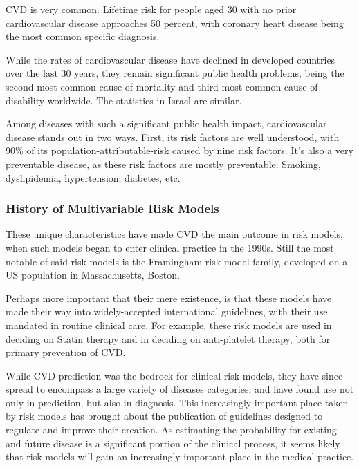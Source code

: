 \documentclass[a4paper,12pt]{article}
\begin{document}
			CVD is very common. Lifetime risk for people aged 30 with no prior cardiovascular disease approaches 50 percent\cite{Rapsomaniki2014}, with coronary heart disease being the most common specific diagnosis\cite{Benjamin2017}.
			
			While the rates of cardiovascular disease have declined in developed countries over the last 30 years\cite{Koton2014,Vangen-Loenne2017}, they remain significant public health problems, being the second most common cause of mortality and third most common cause of disability worldwide\cite{Lozano2012}. The statistics in Israel are similar\cite{ICDC2017}.
			
			Among diseases with such a significant public health impact, cardiovascular disease stands out in two ways. First, its risk factors are well understood, with 90\% of its population-attributable-risk caused by nine risk factors. It's also a very preventable disease, as these risk factors are mostly preventable\cite{Yusuf2004,ODonnell2016}: Smoking, dyslipidemia, hypertension, diabetes, etc.
			
			\subsubsection{History of Multivariable Risk Models}
			
			These unique characteristics have made CVD the main outcome in risk models, when such models began to enter clinical practice in the 1990s\cite{Wilson1998,NationalCholesterolEducationProgramNCEPExpertPanelonDetection2002,Conroy2003,Hippisley-Cox2007,DAgostino2008,Hippisley-Cox2008,Goff2014}. Still the most notable of said risk models is the Framingham risk model family, developed on a US population in Massachusetts, Boston\cite{Wilson1998}.
			
			Perhaps more important that their mere existence, is that these models have made their way into widely-accepted international guidelines, with their use mandated in routine clinical care. For example, these risk models are used in deciding on Statin therapy\cite{Goff2014} and in deciding on anti-platelet therapy\cite{Bibbins-Domingo2016}, both for primary prevention of CVD.
			
			While CVD prediction was the bedrock for clinical risk models, they have since spread to encompass a large variety of diseases categories\cite{Kanis2008,Kansagara2011}, and have found use not only in prediction, but also in diagnosis\cite{Usher-Smith2016}. This increasingly important place taken by risk models has brought about the publication of guidelines designed to regulate and improve their creation\cite{Collins2015}. As estimating the probability for existing and future disease is a significant portion of the clinical process\cite{Moons2009}, it seems likely that risk models will gain an increasingly important place in the medical practice.
			
\end{document}

